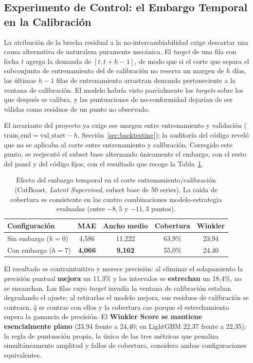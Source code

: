 \subsection{Experimento de Control: el Embargo Temporal en la Calibración}
\label{sec:embargo_calibracion}

La atribución de la brecha residual a la no-intercambiabilidad exige descartar una
causa alternativa de naturaleza puramente mecánica. El \textit{target} de una fila
con fecha $t$ agrega la demanda de $[t, t+h-1]$, de modo que si el corte que separa
el subconjunto de entrenamiento del de calibración no reserva un margen de $h$ días,
las últimas $h-1$ filas de entrenamiento arrastran demanda perteneciente a la
ventana de calibración. El modelo habría visto parcialmente los \textit{targets}
sobre los que después se calibra, y las puntuaciones de no-conformidad dejarían de
ser válidas como residuos de un punto no observado.

El invariante del proyecto ya exige ese margen entre entrenamiento y validación
($\text{train\_end} = \text{val\_start} - h$, Sección~\ref{sec:backtesting}); la
auditoría del código reveló que no se aplicaba al corte entre entrenamiento y
calibración. Corregido este punto, se reejecutó el subset base alternando
únicamente el embargo, con el resto del panel y del código fijos, con el resultado que
recoge la Tabla~\ref{tab:embargo_control}.

\begin{table}[htbp]
    \centering
    \small
    \begin{tabular}{lcccc}
        \toprule
        \textbf{Configuración} & \textbf{MAE} & \textbf{Ancho medio} & \textbf{Cobertura} & \textbf{Winkler} \\
        \midrule
        Sin embargo ($h=0$) & 4{,}586 & 11{,}222 & 63{,}9\% & 23{,}94 \\
        Con embargo ($h=7$) & \textbf{4{,}066} & \textbf{9{,}162} & 55{,}0\% & 24{,}40 \\
        \bottomrule
    \end{tabular}
    \caption[Efecto del embargo temporal en la calibración]{Efecto del embargo temporal en el corte entrenamiento/calibración (CatBoost, \textit{Latent Supervised}, subset base de 50 series). La caída de cobertura es consistente en las cuatro combinaciones modelo-estrategia evaluadas (entre $-8{,}5$ y $-11{,}3$ puntos).}
    \label{tab:embargo_control}
\end{table}

El resultado es contraintuitivo y merece precisión: al eliminar el solapamiento la
precisión puntual \textbf{mejora} un 11{,}3\% y los intervalos se \textbf{estrechan}
un 18{,}4\%, no se ensanchan. Las filas cuyo \textit{target} invadía la ventana de
calibración estaban degradando el ajuste; al retirarlas el modelo mejora, sus
residuos de calibración se contraen, $\hat{q}$ se contrae con ellos y la cobertura
cae porque el estrechamiento supera la ganancia de precisión. El \textbf{Winkler
Score se mantiene esencialmente plano} (23{,}94 frente a 24{,}40; en LightGBM 22{,}37
frente a 22{,}35): la regla de puntuación propia, la única de las tres métricas que
penaliza simultáneamente amplitud y fallos de cobertura, considera ambas
configuraciones equivalentes.


